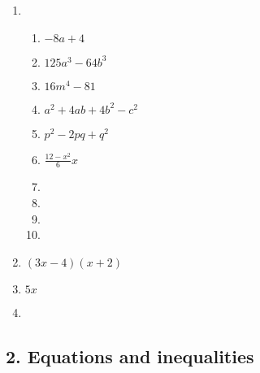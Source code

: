 {\begin{multicols}{3}
\begin{enumerate}[noitemsep, label=\textbf{\arabic*}. ]
\item %

\begin{enumerate}[noitemsep, label=\textbf{(\alph*)} ] 

\item$-8a + 4$%
\item $125a^3 - 64b^3$ %
\item $16m^4 - 81$%
\item $a^2 + 4ab + 4b^2 - c^2$%
\item $p^2 - 2pq +q^2$%
\item $\frac{12 - x^2}{6}x$%
\item %
\item %
\item %
\item %
\end{enumerate}


\item $(3x - 4)(x + 2)$%
\item $5x$%
\item %
\end{enumerate}

\end{multicols}


\subsection* {2. Equations and inequalities}

}
